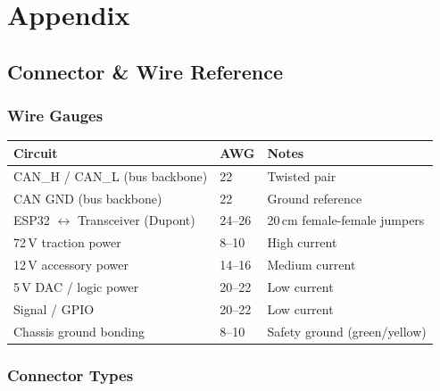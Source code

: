 \documentclass[12pt,a4paper,oneside]{report}
\begin{document}

\appendix
\part*{Appendix}

\chapter{Connector \& Wire Reference}

\section{Wire Gauges}

\begin{center}
\begin{tabular}{lll}
\toprule
\textbf{Circuit} & \textbf{AWG} & \textbf{Notes} \\
\midrule
CAN\_H / CAN\_L (bus backbone) & 22 & Twisted pair \\
CAN GND (bus backbone)         & 22 & Ground reference \\
ESP32 $\leftrightarrow$ Transceiver (Dupont) & 24--26 & 20\,cm female-female jumpers \\
72\,V traction power           & 8--10  & High current \\
12\,V accessory power          & 14--16 & Medium current \\
5\,V DAC / logic power         & 20--22 & Low current \\
Signal / GPIO                  & 20--22 & Low current \\
Chassis ground bonding         & 8--10  & Safety ground (green/yellow) \\
\bottomrule
\end{tabular}
\end{center}

\section{Connector Types}
\end{document}
